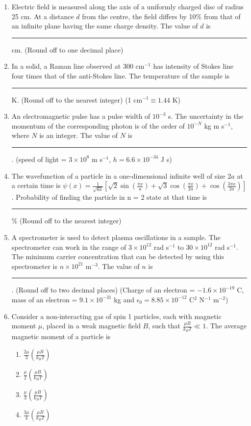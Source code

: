 \documentclass[journal,12pt,onecolumn]{IEEEtran}
\theoremstyle{remark}
\begin{document}
\begin{enumerate}
\item
Electric field is measured along the axis of a uniformly charged disc of radius 25 cm. At a distance $d$ from the centre, the field differs by 10\% from that of an infinite plane having the same charge density. The value of $d$ is \rule{1cm}{0.4pt} cm. (Round off to one decimal place)


\item
In a solid, a Raman line observed at 300 cm$^{-1}$ has intensity of Stokes line four times that of the anti-Stokes line. The temperature of the sample is \rule{1cm}{0.4pt} K. (Round off to the nearest integer) (1 cm$^{-1} \equiv 1.44$ K)


\item
An electromagnetic pulse has a pulse width of $10^{-3}$ s. The uncertainty in the momentum of the corresponding photon is of the order of $10^{-N}$ kg m s$^{-1}$, where $N$ is an integer. The value of $N$ is \rule{1cm}{0.4pt}. (speed of light = $3 \times 10^8$ m s$^{-1}$, $h = 6.6 \times 10^{-34}$ J s)


\item
The wavefunction of a particle in a one-dimensional infinite well of size $2a$ at a certain time is $\psi(x) = \frac{1}{\sqrt{6a}} \left[ \sqrt{2}\sin\left(\frac{\pi x}{a}\right) + \sqrt{3}\cos\left(\frac{\pi x}{2a}\right) + \cos\left(\frac{3\pi x}{2a}\right) \right]$. Probability of finding the particle in n = 2 state at that time is \rule{1cm}{0.4pt}\% (Round off to the nearest integer)


\item
A spectrometer is used to detect plasma oscillations in a sample. The spectrometer can work in the range of $3 \times 10^{12}$ rad s$^{-1}$ to $30 \times 10^{12}$ rad s$^{-1}$. The minimum carrier concentration that can be detected by using this spectrometer is $n \times 10^{21}$ m$^{-3}$. The value of $n$ is \rule{1cm}{0.4pt}. (Round off to two decimal places) (Charge of an electron = $-1.6 \times 10^{-19}$ C, mass of an electron = $9.1 \times 10^{-31}$ kg and $\epsilon_0 = 8.85 \times 10^{-12}$ C$^2$ N$^{-1}$ m$^{-2}$)


\item
Consider a non-interacting gas of spin 1 particles, each with magnetic moment $\mu$, placed in a weak magnetic field $B$, such that $\frac{\mu B}{k_B T} \ll 1$. The average magnetic moment of a particle is
\begin{enumerate}
    \item $\frac{2\mu}{3} \left( \frac{\mu B}{k_B T} \right)$
    \item $\frac{\mu}{2} \left( \frac{\mu B}{k_B T} \right)$
    \item $\frac{\mu}{3} \left( \frac{\mu B}{k_B T} \right)$
    \item $\frac{3\mu}{4} \left( \frac{\mu B}{k_B T} \right)$
\end{enumerate}



\end{enumerate}
\end{document}

